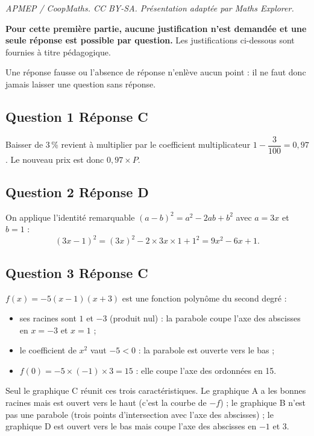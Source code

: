 \documentclass[10pt]{article}
\begin{document}
\noindent\textit{APMEP / CoopMaths. CC BY-SA. Présentation adaptée par Maths Explorer.}\par\medskip
\textbf{Pour cette première partie, aucune justification n'est demandée et une seule réponse est possible par question.} Les justifications ci-dessous sont fournies à titre pédagogique.

Une réponse fausse ou l'absence de réponse n'enlève aucun point : il ne faut donc jamais laisser une question sans réponse.

\subsection*{Question 1 \quad Réponse C}

Baisser de 3\,\% revient à multiplier par le coefficient multiplicateur
$1 - \dfrac{3}{100} = 0,97$. Le nouveau prix est donc $0,97 \times P$.



\subsection*{Question 2 \quad Réponse D}

On applique l'identité remarquable $(a-b)^2 = a^2 - 2ab + b^2$ avec $a = 3x$ et $b = 1$ :
\[(3x-1)^2 = (3x)^2 - 2\times 3x \times 1 + 1^2 = 9x^2 - 6x + 1.\]

\subsection*{Question 3 \quad Réponse C}

$f(x) = -5(x-1)(x+3)$ est une fonction polynôme du second degré :
\begin{itemize}
	\item ses racines sont $1$ et $-3$ (produit nul) : la parabole coupe l'axe des abscisses
	en $x = -3$ et $x = 1$ ;
	\item le coefficient de $x^2$ vaut $-5 < 0$ : la parabole est ouverte vers le bas ;
	\item $f(0) = -5 \times (-1) \times 3 = 15$ : elle coupe l'axe des ordonnées en 15.
\end{itemize}
Seul le graphique C réunit ces trois caractéristiques. Le graphique A a les bonnes racines
mais est ouvert vers le haut (c'est la courbe de $-f$) ; le graphique B n'est pas une
parabole (trois points d'intersection avec l'axe des abscisses) ; le graphique D est
ouvert vers le bas mais coupe l'axe des abscisses en $-1$ et $3$.
\end{document}
